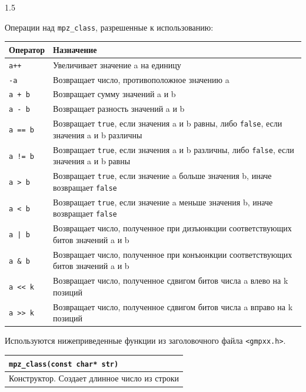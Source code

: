 \documentclass[14pt,a4paper]{extarticle}
\begin{document}
\begin{spacing}{1.5}

\noindent Операции над \texttt{mpz\_class}, разрешенные к использованию:

\vspace{0.2cm}
\renewcommand{\arraystretch}{1.1} 
\noindent\begin{tabularx}{\textwidth}{|l|X|}
\hline
\textbf{Оператор} & \textbf{Назначение} \\
\hline
\texttt{a++} & Увеличивает значение a на единицу \\
\hline
\texttt{-a} & Возвращает число, противоположное значению a \\
\hline
\texttt{a + b} & Возвращает сумму значений a и b \\
\hline
\texttt{a - b} & Возвращает разность значений a и b \\
\hline
\texttt{a == b} & Возвращает \texttt{true}, если значения a и b равны, либо \texttt{false}, если значения a и b различны \\
\hline
\texttt{a != b} & Возвращает \texttt{true}, если значения a и b различны, либо \texttt{false}, если значения a и b равны \\
\hline
\texttt{a > b} & Возвращает \texttt{true}, если значение a больше значения b, иначе возвращает \texttt{false} \\
\hline
\texttt{a < b} & Возвращает \texttt{true}, если значение a меньше значения b, иначе возвращает \texttt{false} \\
\hline
\texttt{a | b} & Возвращает число, полученное при дизъюнкции соответствующих битов значений a и b \\
\hline
\texttt{a \& b} & Возвращает число, полученное при конъюнкции соответствующих битов значений a и b \\
\hline
\texttt{a << k} & Возвращает число, полученное сдвигом битов числа a влево на k позиций \\
\hline
\texttt{a >> k} & Возвращает число, полученное сдвигом битов числа a вправо на k позиций \\
\hline
\end{tabularx}

\vspace{0.5cm}

\noindent Используются нижеприведенные функции из заголовочного файла \texttt{<gmpxx.h>}.

\vspace{0.2cm}

\noindent\begin{tabularx}{\textwidth}{|X|}
\hline
\texttt{mpz\_class(const char* str)} \\
\hline
Конструктор. Создает длинное число из строки \\
\hline
\end{tabularx}


\end{spacing}
\end{document}

